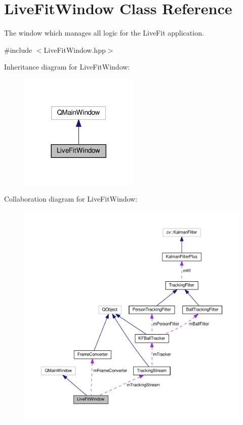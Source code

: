 \hypertarget{classLiveFitWindow}{}\section{Live\+Fit\+Window Class Reference}
\label{classLiveFitWindow}


The window which manages all logic for the Live\+Fit application.  




{\ttfamily \#include $<$Live\+Fit\+Window.\+hpp$>$}



Inheritance diagram for Live\+Fit\+Window\+:\nopagebreak
\begin{figure}[H]
\begin{center}
\leavevmode
\includegraphics[width=161pt]{classLiveFitWindow__inherit__graph}
\end{center}
\end{figure}


Collaboration diagram for Live\+Fit\+Window\+:\nopagebreak
\begin{figure}[H]
\begin{center}
\leavevmode
\includegraphics[width=350pt]{classLiveFitWindow__coll__graph}
\end{center}
\end{figure}
